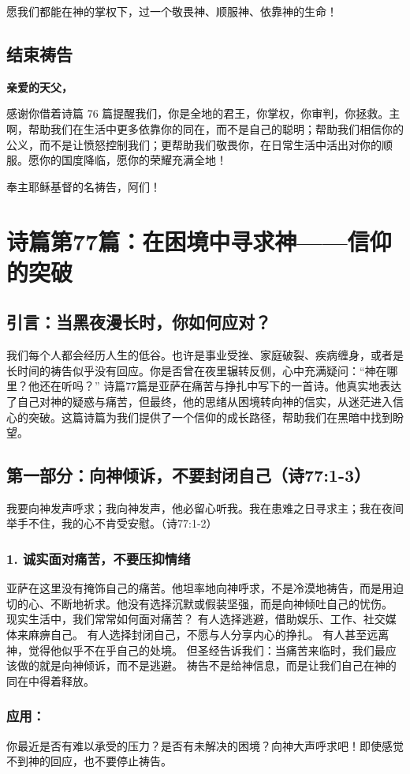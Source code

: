 \documentclass[a4paper, 12pt]{article}
\begin{document}
愿我们都能在神的掌权下，过一个敬畏神、顺服神、依靠神的生命！

\subsection*{结束祷告}
\textbf{亲爱的天父，}

感谢你借着诗篇 76 篇提醒我们，你是全地的君王，你掌权，你审判，你拯救。主啊，帮助我们在生活中更多依靠你的同在，而不是自己的聪明；帮助我们相信你的公义，而不是让愤怒控制我们；更帮助我们敬畏你，在日常生活中活出对你的顺服。愿你的国度降临，愿你的荣耀充满全地！

奉主耶稣基督的名祷告，阿们！
\newpage
\section{诗篇第77篇：在困境中寻求神——信仰的突破}
\subsection*{引言：当黑夜漫长时，你如何应对？}
我们每个人都会经历人生的低谷。也许是事业受挫、家庭破裂、疾病缠身，或者是长时间的祷告似乎没有回应。你是否曾在夜里辗转反侧，心中充满疑问：“神在哪里？他还在听吗？”
诗篇77篇是亚萨在痛苦与挣扎中写下的一首诗。他真实地表达了自己对神的疑惑与痛苦，但最终，他的思绪从困境转向神的信实，从迷茫进入信心的突破。这篇诗篇为我们提供了一个信仰的成长路径，帮助我们在黑暗中找到盼望。
\subsection*{第一部分：向神倾诉，不要封闭自己（诗77:1-3）}
我要向神发声呼求；我向神发声，他必留心听我。我在患难之日寻求主；我在夜间举手不住，我的心不肯受安慰。（诗77:1-2）
\subsubsection*{1. 诚实面对痛苦，不要压抑情绪}
亚萨在这里没有掩饰自己的痛苦。他坦率地向神呼求，不是冷漠地祷告，而是用迫切的心、不断地祈求。他没有选择沉默或假装坚强，而是向神倾吐自己的忧伤。
现实生活中，我们常常如何面对痛苦？
有人选择逃避，借助娱乐、工作、社交媒体来麻痹自己。
有人选择封闭自己，不愿与人分享内心的挣扎。
有人甚至远离神，觉得他似乎不在乎自己的处境。
但圣经告诉我们：当痛苦来临时，我们最应该做的就是向神倾诉，而不是逃避。 祷告不是给神信息，而是让我们自己在神的同在中得着释放。
\subsubsection*{应用：}
你最近是否有难以承受的压力？是否有未解决的困境？向神大声呼求吧！即使感觉不到神的回应，也不要停止祷告。
\end{document}
